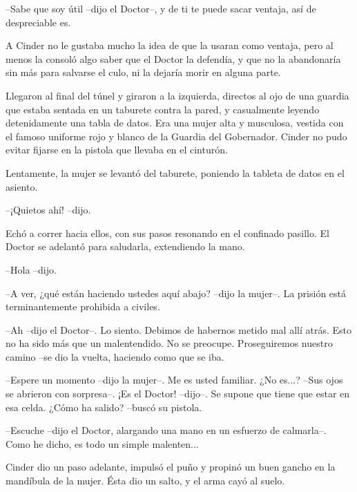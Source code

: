 --Sabe que soy útil --dijo el Doctor--, y de ti te puede sacar ventaja, así de despreciable es.



A Cinder no le gustaba mucho la idea de que la usaran como ventaja, pero al menos la consoló algo saber que el Doctor la defendía, y que no la abandonaría sin más para salvarse el culo, ni la dejaría morir en alguna parte.

Llegaron al final del túnel y giraron a la izquierda, directos al ojo de una guardia que estaba sentada en un taburete contra la pared, y casualmente leyendo detenidamente una tabla de datos.  Era una mujer alta y musculosa, vestida con el famoso uniforme rojo y blanco de la Guardia del Gobernador. Cinder no pudo evitar fijarse en la pistola que llevaba en el cinturón.

Lentamente, la mujer se levantó del taburete, poniendo la tableta de datos en el asiento.



--¡Quietos ahí! --dijo.



Echó a correr hacia ellos, con sus pasos resonando en el confinado pasillo. El Doctor se adelantó para saludarla, extendiendo la mano.



--Hola --dijo.



--A ver, ¿qué están haciendo ustedes aquí abajo? --dijo la mujer--. La prisión está terminantemente prohibida a civiles.



--Ah --dijo el Doctor--. Lo siento. Debimos de habernos metido mal allí atrás. Esto no ha sido más que un malentendido. No se preocupe. Proseguiremos nuestro camino --se dio la vuelta, haciendo como que se iba.



--Espere un momento --dijo la mujer--. Me es usted familiar. ¿No es...? --Sus ojos se abrieron con sorpresa--. ¡Es el Doctor! --dijo--. Se supone que tiene que estar en esa celda. ¿Cómo ha salido? --buscó su pistola.



--Escuche --dijo el Doctor, alargando una mano en un esfuerzo de calmarla--. Como he dicho, es todo un simple malenten...



Cinder dio un paso adelante, impulsó el puño y propinó un buen gancho en la mandíbula de la mujer. Ésta dio un salto, y el arma cayó al suelo.



